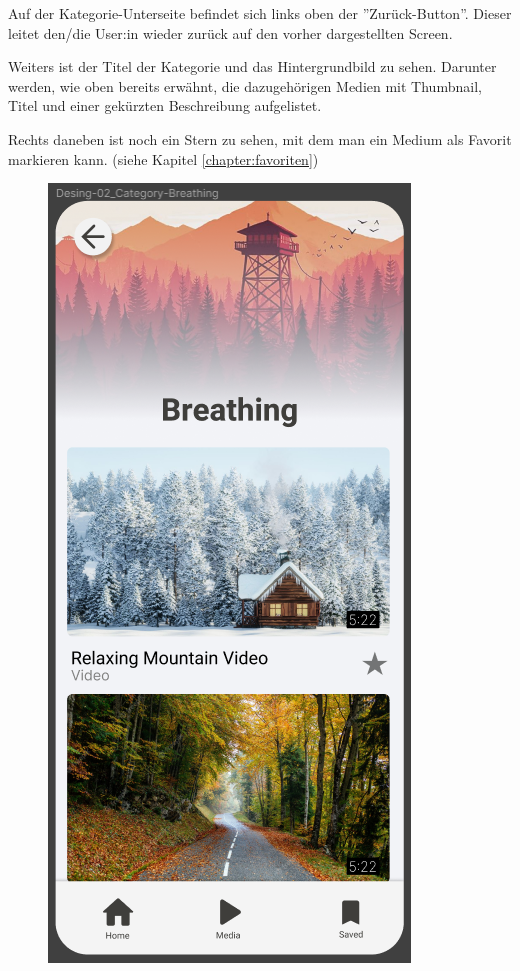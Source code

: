 \newpage

Auf der Kategorie-Unterseite befindet sich links oben der ''Zurück-Button''. Dieser leitet den/die User:in wieder
zurück auf den vorher dargestellten Screen.

Weiters ist der Titel der Kategorie und das Hintergrundbild zu sehen. Darunter werden, wie oben bereits erwähnt, die
dazugehörigen Medien mit Thumbnail, Titel und einer gekürzten Beschreibung aufgelistet.

Rechts daneben ist noch ein
Stern zu sehen, mit dem man ein Medium als Favorit markieren kann. (siehe Kapitel \ref{chapter:favoriten})

\begin{figure}[H]
    \begin{minipage}{0.5\textwidth}
        \centering
        \includegraphics[height=2\textwidth]{./pics/pKategorie.png}

\end{minipage}
\end{figure}
